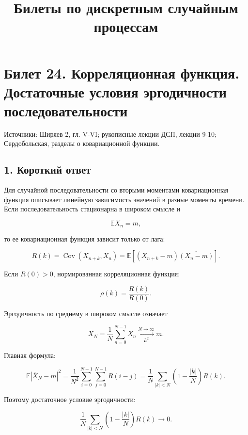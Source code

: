 \documentclass[
  11pt,
  a4paper,
]{article}
\title{Билеты по дискретным случайным процессам}
\author{}
\date{}
\begin{document}
\maketitle

\section{Билет 24. Корреляционная функция. Достаточные условия
эргодичности
последовательности}\label{ux431ux438ux43bux435ux442-24.-ux43aux43eux440ux440ux435ux43bux44fux446ux438ux43eux43dux43dux430ux44f-ux444ux443ux43dux43aux446ux438ux44f.-ux434ux43eux441ux442ux430ux442ux43eux447ux43dux44bux435-ux443ux441ux43bux43eux432ux438ux44f-ux44dux440ux433ux43eux434ux438ux447ux43dux43eux441ux442ux438-ux43fux43eux441ux43bux435ux434ux43eux432ux430ux442ux435ux43bux44cux43dux43eux441ux442ux438}

Источники: Ширяев 2, гл. V-VI; рукописные лекции ДСП, лекции 9-10;
Сердобольская, разделы о ковариационной функции.

\subsection{1. Короткий
ответ}\label{ux43aux43eux440ux43eux442ux43aux438ux439-ux43eux442ux432ux435ux442}

Для случайной последовательности со вторыми моментами ковариационная
функция описывает линейную зависимость значений в разные моменты
времени. Если последовательность стационарна в широком смысле и

\[
\mathbb E X_n=m,
\]

то ее ковариационная функция зависит только от лага:

\[
R(k)=\operatorname{Cov}(X_{n+k},X_n)
=
\mathbb E[(X_{n+k}-m)\overline{(X_n-m)}].
\]

Если \(R(0)>0\), нормированная корреляционная функция:

\[
\rho(k)=\frac{R(k)}{R(0)}.
\]

Эргодичность по среднему в широком смысле означает

\[
\overline X_N=\frac1N\sum_{n=0}^{N-1}X_n
\xrightarrow[L^2]{N\to\infty}
m.
\]

Главная формула:

\[
\mathbb E|\overline X_N-m|^2
=
\frac1{N^2}\sum_{i=0}^{N-1}\sum_{j=0}^{N-1}R(i-j)
=
\frac1N\sum_{|k|<N}\left(1-\frac{|k|}{N}\right)R(k).
\]

Поэтому достаточное условие эргодичности:

\[
\frac1N\sum_{|k|<N}\left(1-\frac{|k|}{N}\right)R(k)\to0.
\]
\end{document}
